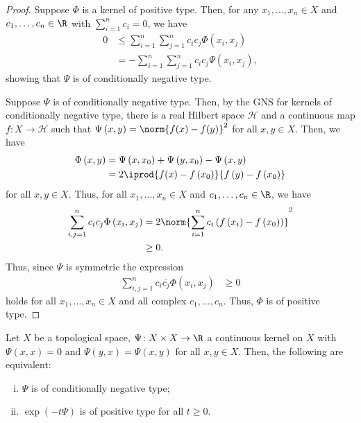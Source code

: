 \documentclass[10pt]{mypackage}
\begin{document}
\begin{proof}
  Suppose $\Phi$ is a kernel of positive type. Then, for any $x_1,\dots,x_n\in X$ and $c_1,\dots,c_n\in \R$ with $\sum_{i=1}^{n}c_i = 0$, we have
  \begin{align*}
    0 &\leq \sum_{i=1}^{n}\sum_{j=1}^{n}c_ic_j\Phi\left( x_i,x_j \right)\\
      &= -\sum_{i=1}^{n}\sum_{j=1}^{n}c_ic_j\Psi\left( x_i,x_j \right),
  \end{align*}
  showing that $\Psi$ is of conditionally negative type.

  Suppose $\Psi$ is of conditionally negative type. Then, by the GNS for kernels of conditionally negative type, there is a real Hilbert space $\mathscr{H}$ and a continuous map $f\colon X\to \mathscr{H}$ such that $\Psi\left( x,y \right) = \norm{f(x)-f(y)}^2$ for all $x,y\in X$. Then, we have
  \begin{align*}
    \Phi\left( x,y \right) &= \Psi\left( x,x_0 \right) + \Psi\left( y,x_0 \right) - \Psi\left( x,y \right)\\
                           &= 2 \iprod{f(x)-f\left( x_0 \right)}{f\left( y \right)-f\left( x_0 \right)}
  \end{align*}
  for all $x,y\in X$. Thus, for all $x_1,\dots,x_n\in X$ and $c_1,\dots,c_n\in \R$, we have
  \begin{align*}
    \sum_{i,j=1}^{n}c_ic_j\Phi\left( x_i,x_j \right) &= 2\norm{\sum_{i=1}^{n}c_i\left( f\left( x_i \right)-f\left( x_0 \right) \right)}^2\\
                                                     &\geq 0.
  \end{align*}
  Thus, since $\Psi$ is symmetric the expression
  \begin{align*}
    \sum_{i,j=1}^{n} c_i \overline{c_j}\Phi\left( x_i,x_j \right) &\geq 0
  \end{align*}
  holds for all $x_1,\dots,x_n\in X$ and all complex $c_1,\dots,c_n$. Thus, $\Phi$ is of positive type.
\end{proof}
\begin{theorem}
  Let $X$ be a topological space, $\Psi\colon X\times X\to \R$ a continuous kernel on $X$ with $\Psi\left( x,x \right) = 0$ and $\Psi\left( y,x \right) = \Psi\left( x,y \right)$ for all $x,y\in X$. Then, the following are equivalent:
  \begin{enumerate}[(i)]
    \item $\Psi$ is of conditionally negative type;
    \item $\exp\left( -t\Psi \right)$ is of positive type for all $t\geq 0$.
  \end{enumerate}
\end{theorem}
\end{document}
